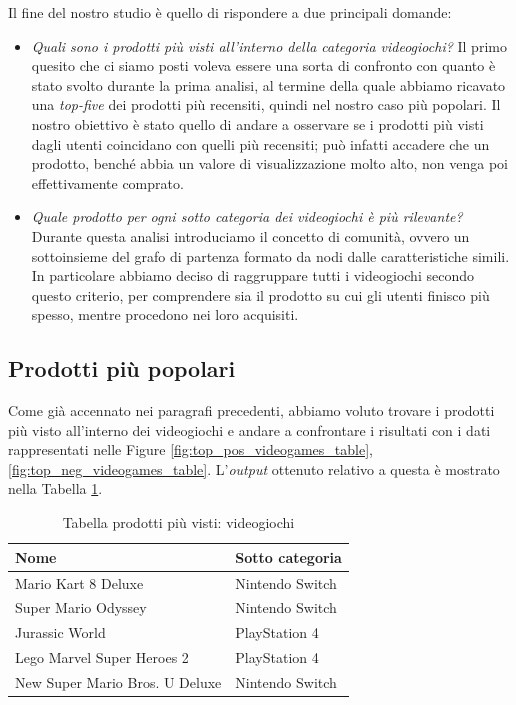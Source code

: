 		Il fine del nostro studio è quello di rispondere a due principali domande: 
		\begin{itemize}
			\item \textit{Quali sono i prodotti più visti all'interno della categoria videogiochi?}
			Il primo quesito che ci siamo posti voleva essere una sorta di confronto con quanto è stato svolto durante la prima analisi, al termine della quale abbiamo ricavato una \textit{top-five} dei prodotti più recensiti, quindi nel nostro caso più popolari. Il nostro obiettivo è stato quello di andare a osservare se i prodotti più visti dagli utenti coincidano con quelli più recensiti; può infatti accadere che un prodotto, benché abbia un valore di visualizzazione molto alto, non venga poi effettivamente comprato.
			
			\item \textit{Quale prodotto per ogni sotto categoria dei videogiochi è più rilevante?}
			Durante questa analisi introduciamo il concetto di comunità, ovvero un sottoinsieme del grafo di partenza formato da nodi dalle caratteristiche simili. In particolare abbiamo deciso di raggruppare tutti i videogiochi secondo questo criterio, per comprendere sia il prodotto su cui gli utenti finisco più spesso, mentre procedono nei loro acquisiti.
		\end{itemize}
	
	
		\subsection{Prodotti più popolari}
			Come già accennato nei paragrafi precedenti, abbiamo voluto trovare i prodotti più visto all'interno dei videogiochi e andare a confrontare i risultati con i dati rappresentati nelle Figure \ref{fig:top_pos_videogames_table}, \ref{fig:top_neg_videogames_table}. L'\textit{output} ottenuto relativo a questa è mostrato nella Tabella \ref{tab:top-five-videogames-network}.
			
			\begin{table} [H]
				\caption{Tabella prodotti più visti: videogiochi}
				\label{tab:top-five-videogames-network}
				\centering
				\begin{tabular}{ll}
					\toprule 
					\textbf{Nome} & \textbf{Sotto categoria} \\
					\midrule
					Mario Kart 8 Deluxe & Nintendo Switch \\
					Super Mario Odyssey & Nintendo Switch \\
					Jurassic World & PlayStation 4 \\
					Lego Marvel Super Heroes 2 & PlayStation 4 \\
					New Super Mario Bros. U Deluxe & Nintendo Switch \\
					\bottomrule
				\end{tabular}
			\end{table}
			
